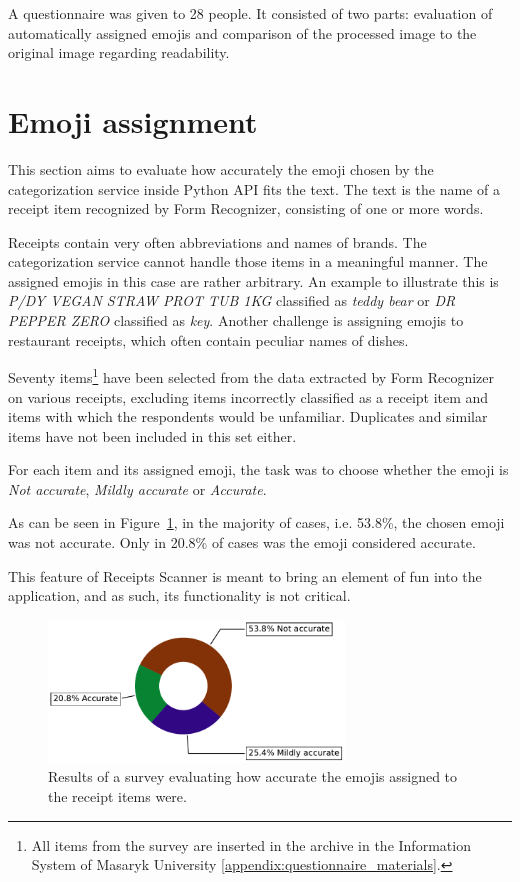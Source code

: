 \documentclass[
  digital, %
  table,   %
  oneside, %
  lof,     %
  lot,     %
]{fithesis3}
\begin{document}
A questionnaire was given to 28 people. It consisted of two parts: evaluation of automatically assigned emojis and comparison of the processed image to the original image regarding readability.

\section{Emoji assignment}
This section aims to evaluate how accurately the emoji chosen by the categorization service inside Python API fits the text. The text is the name of a receipt item recognized by Form Recognizer, consisting of one or more words.

Receipts contain very often abbreviations and names of brands. The categorization service cannot handle those items in a meaningful manner. The assigned emojis in this case are rather arbitrary. An example to illustrate this is \textit{P/DY VEGAN STRAW PROT TUB 1KG} classified as \textit{ teddy bear} or \textit{DR PEPPER ZERO} classified as \textit{ key}. Another challenge is assigning emojis to restaurant receipts, which often contain peculiar names of dishes.

Seventy items\footnote{All items from the survey are inserted in the archive in the Information System of Masaryk University \ref{appendix:questionnaire_materials}.} have been selected from the data extracted by Form Recognizer on various receipts, excluding items incorrectly classified as a receipt item and items with which the respondents would be unfamiliar. Duplicates and similar items have not been included in this set either.

For each item and its assigned emoji, the task was to choose whether the emoji is \textit{Not accurate}, \textit{Mildly accurate} or \textit{Accurate}.

As can be seen in Figure~\ref{fig:quality_of_emojis}, in the majority of cases, i.e. 53.8\%, the chosen emoji was not accurate. Only in 20.8\% of cases was the emoji considered accurate.

This feature of Receipts Scanner is meant to bring an element of fun into the application, and as such, its functionality is not critical. 

\begin{figure}
    \begin{center}
        \includegraphics[width=0.7\textwidth]{figures/graphs/quality_of_emojis}
    \end{center}
    \caption{Results of a survey evaluating how accurate the emojis assigned to the receipt items were.}
    \label{fig:quality_of_emojis}
\end{figure}
\end{document}
